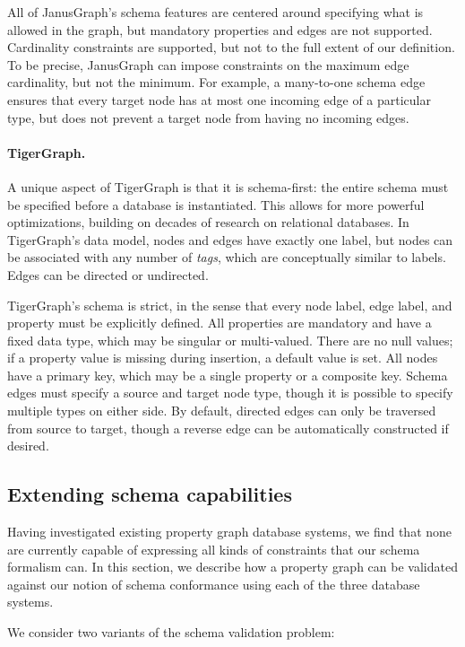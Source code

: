 \documentclass{article}
\theoremstyle{definition}
\begin{document}
All of JanusGraph's schema features are centered around specifying what is allowed in the graph, but mandatory properties and edges are not supported. Cardinality constraints are supported, but not to the full extent of our definition. To be precise, JanusGraph can impose constraints on the maximum edge cardinality, but not the minimum. For example, a many-to-one schema edge ensures that every target node has at most one incoming edge of a particular type, but does not prevent a target node from having no incoming edges.

\paragraph{TigerGraph.} A unique aspect of TigerGraph \citep{deutsch2019tigergraph} is that it is schema-first: the entire schema must be specified before a database is instantiated. This allows for more powerful optimizations, building on decades of research on relational databases. In TigerGraph's data model, nodes and edges have exactly one label, but nodes can be associated with any number of \emph{tags}, which are conceptually similar to labels. Edges can be directed or undirected.

TigerGraph's schema is strict, in the sense that every node label, edge label, and property must be explicitly defined. All properties are mandatory and have a fixed data type, which may be singular or multi-valued. There are no null values; if a property value is missing during insertion, a default value is set. All nodes have a primary key, which may be a single property or a composite key. Schema edges must specify a source and target node type, though it is possible to specify multiple types on either side. By default, directed edges can only be traversed from source to target, though a reverse edge can be automatically constructed if desired.

\subsection{Extending schema capabilities}

Having investigated existing property graph database systems, we find that none are currently capable of expressing all kinds of constraints that our schema formalism can. In this section, we describe how a property graph can be validated against our notion of schema conformance using each of the three database systems.

We consider two variants of the schema validation problem:
\end{document}

